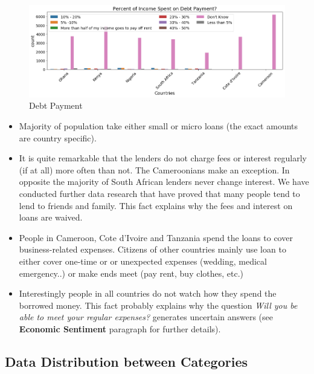 \begin{Schunk}
\begin{figure}[H]

{\centering \includegraphics[width=1.15\linewidth]{../../artifacts/payment} 

}

\caption[Debt Payment]{Debt Payment}\label{fig:dtp}
\end{figure}
\end{Schunk}

\begin{itemize}
\tightlist
\item
  Majority of population take either small or micro loans (the exact
  amounts are country specific).
\item
  It is quite remarkable that the lenders do not charge fees or interest
  regularly (if at all) more often than not. The Cameroonians make an
  exception. In opposite the majority of South African lenders never
  change interest. We have conducted further data research that have
  proved that many people tend to lend to friends and family. This fact
  explains why the fees and interest on loans are waived.
\item
  People in Cameroon, Cote d'Ivoire and Tanzania spend the loans to
  cover business-related expenses. Citizens of other countries mainly
  use loan to either cover one-time or or unexpected expenses (wedding,
  medical emergency..) or make ends meet (pay rent, buy clothes, etc.)
\item
  Interestingly people in all countries do not watch how they spend the
  borrowed money. This fact probably explains why the question
  \emph{Will you be able to meet your regular expenses?} generates
  uncertain answers (see \textbf{Economic Sentiment} paragraph for
  further details).
\end{itemize}

\hypertarget{data-distribution-between-categories}{%
\subsection{Data Distribution between
Categories}\label{data-distribution-between-categories}}

